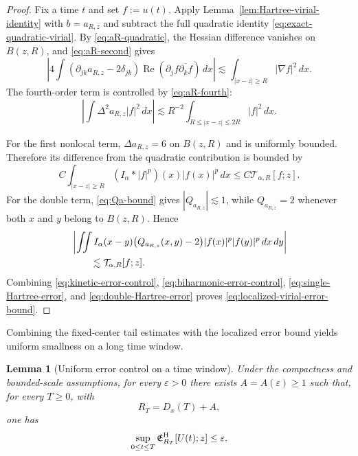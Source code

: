 \documentclass[preprint,12pt]{elsarticle}
\numberwithin{equation}{section}
\newtheorem{lemma}[theorem]{Lemma}
\theoremstyle{remark}
\newcommand{\eps}{\varepsilon}
\newcommand{\dd}{\,d}
\newcommand{\Ttail}[1]{\mathcal T_{\alpha,#1}}
\begin{document}
\begin{proof}
Fix a time $t$ and set $f:=u(t)$. Apply Lemma~\ref{lem:Hartree-virial-identity} with $b=a_{R,z}$ and subtract the full quadratic identity \eqref{eq:exact-quadratic-virial}. By \eqref{eq:aR-quadratic}, the Hessian difference vanishes on $B(z,R)$, and \eqref{eq:aR-second} gives
\begin{equation}\label{eq:kinetic-error-control}
  \left|
  4\int(\partial_{jk}a_{R,z}-2\delta_{jk})
  \operatorname{Re}(\partial_jf\overline{\partial_kf})\dd x
  \right|
  \lesssim\int_{|x-z|\ge R}|\nabla f|^2\dd x.
\end{equation}
The fourth-order term is controlled by \eqref{eq:aR-fourth}:
\begin{equation}\label{eq:biharmonic-error-control}
  \left|\int\Delta^2a_{R,z}|f|^2\dd x\right|
  \lesssim R^{-2}
  \int_{R\le|x-z|\le2R}|f|^2\dd x.
\end{equation}

For the first nonlocal term, $\Delta a_{R,z}=6$ on $B(z,R)$ and is uniformly bounded. Therefore its difference from the quadratic contribution is bounded by
\begin{equation}\label{eq:single-Hartree-error}
  C\int_{|x-z|\ge R}(I_\alpha*|f|^p)(x)|f(x)|^p\dd x
  \le C\Ttail{R}[f;z].
\end{equation}
For the double term, \eqref{eq:Qa-bound} gives $|Q_{a_{R,z}}|\lesssim1$, while $Q_{a_{R,z}}=2$ whenever both $x$ and $y$ belong to $B(z,R)$. Hence
\begin{align}
 &\left|\iint I_\alpha(x-y)
  \bigl(Q_{a_{R,z}}(x,y)-2\bigr)|f(x)|^p|f(y)|^p\dd x\dd y\right|\notag\\
 &\qquad\lesssim\Ttail{R}[f;z].
 \label{eq:double-Hartree-error}
\end{align}
Combining \eqref{eq:kinetic-error-control}, \eqref{eq:biharmonic-error-control}, \eqref{eq:single-Hartree-error}, and \eqref{eq:double-Hartree-error} proves \eqref{eq:localized-virial-error-bound}.
\end{proof}

Combining the fixed-center tail estimates with the localized error bound yields uniform smallness on a long time window.

\begin{lemma}[Uniform error control on a time window]\label{lem:uniform-Hartree-error}
Under the compactness and bounded-scale assumptions, for every $\eps>0$ there exists $A=A(\eps)\ge1$ such that, for every $T\ge0$, with
\begin{equation*}
  R_T=D_x(T)+A,
\end{equation*}
one has
\begin{equation}\label{eq:uniform-error-small}
  \sup_{0\le t\le T}
  \mathfrak E_{R_T}^{\rm H}[U(t);z]\le\eps.
\end{equation}
\end{lemma}
\end{document}
